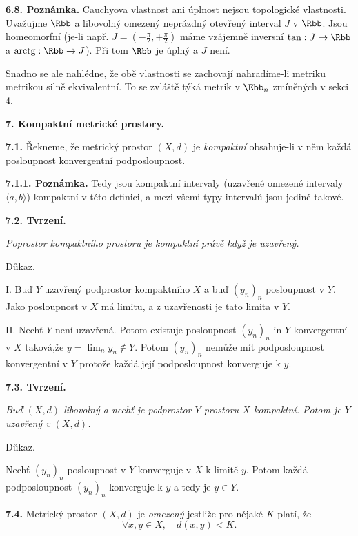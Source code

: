 \documentclass[12pt]{article}
\begin{document}
{ \bigskip
 
 {\bf 6.8. Poznámka.} Cauchyova vlastnost ani úplnost nejsou topologické vlastnosti. Uvažujme $\Rbb$ a libovolný omezený neprázdný otevřený interval   $J$ v $\Rbb$. Jsou homeomorfní (je-li např. $J=(-\frac{\pi}{2},+\frac{\pi}{2})$ máme vzájemně inversní $\tan:J\to\Rbb$ a $\text{arctg}:\Rbb\to J$). Při tom $\Rbb$ je úplný a  $J$ není.
 
Snadno se ale nahlédne, že obě vlastnosti se zachovají nahradíme-li metriku metrikou silně ekvivalentní. To se zvláště týká metrik v $\Ebb_n$ zmíněných v sekci 4.
 
 
  \vskip10mm
 
 {\large\bf 7. Kompaktní metrické prostory.}
  
 \bigskip
 
 {\bf 7.1.} Řekneme, že metrický prostor $(X,d)$ je  {\em kompaktní} obsahuje-li v něm každá posloupnost konvergentní podposloupnost.
 
 \medskip
 
 {\bf 7.1.1. Poznámka.} Tedy jsou kompaktní intervaly (uzavřené omezené intervaly $\langle a,b\rangle$)
 kompaktní v této definici, a mezi všemi typy intervalů jsou jediné takové.
 
 \bigskip
 
 {\bf 7.2. Tvrzení.} {\em Poprostor kompaktního prostoru je kompaktní právě když je uzavřený.
 
 Důkaz.} I. Buď $Y$ uzavřený podprostor kompaktního $X$ a buď $(y_n)_n$ posloupnost v $Y$. Jako posloupnost v $X$ má limitu, a z uzavřenosti je tato limita v $Y$.
 
 II. Nechť $Y$ není uzavřená. Potom existuje posloupnost  $(y_n)_n$ in $Y$ konvergentní v $X$ taková,že
 $y=\lim_ny_n\notin Y$. Potom $(y_n)_n$ nemůže mít podposloupnost konvergentní v $Y$ protože každá její podposloupnost konverguje k $y$. \sq
 
 \bigskip
 
 {\bf 7.3. Tvrzení.} {\em Buď $(X,d)$ libovolný  a nechť je podprostor $Y$ prostoru $X$ kompaktní. Potom je $Y$ uzavřený v $(X,d)$.
  
 Důkaz.}  Nechť $(y_n)_n$  posloupnost v $Y$ konverguje v $X$ k limitě $y$. Potom každá podposloupnost 
  $(y_n)_n$ konverguje k $y$ a tedy je $y\in Y$. \sq
 
 \bigskip
 
 {\bf 7.4.} Metrický prostor  $(X,d)$ je {\em omezený} jestliže pro nějaké $K$ platí, že
 $$
 \forall x,y\in X,\quad d(x,y)< K.
 $$
 
}
\end{document}
